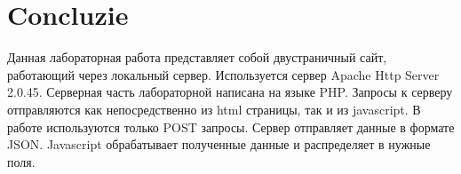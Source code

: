 \section*{Concluzie}
{}
Данная лабораторная работа представляет собой двустраничный сайт, работающий через локальный сервер. Используется сервер Apache Http Server 2.0.45. Серверная часть лабораторной написана на языке PHP. Запросы к серверу отправляются как непосредственно из html страницы, так и из javascript. В работе используются только POST запросы. Сервер отправляет данные в формате JSON. Javascript обрабатывает полученные данные и распределяет в нужные поля.

\clearpage